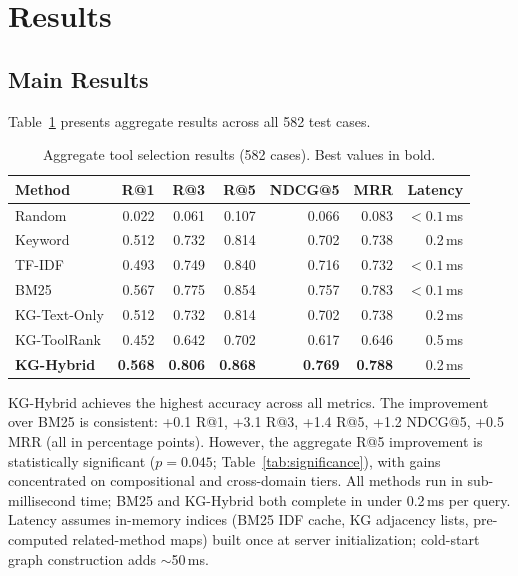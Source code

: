 \documentclass[11pt,a4paper]{article}
\begin{document}
\section{Results}
\label{sec:results}

\subsection{Main Results}

Table~\ref{tab:main-results} presents aggregate results across all 582 test cases.

\begin{table}[t]
\centering
\caption{Aggregate tool selection results (582 cases). Best values in bold.}
\label{tab:main-results}
\begin{tabular}{lrrrrrr}
\toprule
Method & R@1 & R@3 & R@5 & NDCG@5 & MRR & Latency \\
\midrule
Random & 0.022 & 0.061 & 0.107 & 0.066 & 0.083 & ${<}0.1$\,ms \\
Keyword & 0.512 & 0.732 & 0.814 & 0.702 & 0.738 & 0.2\,ms \\
TF-IDF & 0.493 & 0.749 & 0.840 & 0.716 & 0.732 & ${<}0.1$\,ms \\
BM25 & 0.567 & 0.775 & 0.854 & 0.757 & 0.783 & ${<}0.1$\,ms \\
KG-Text-Only & 0.512 & 0.732 & 0.814 & 0.702 & 0.738 & 0.2\,ms \\
KG-ToolRank & 0.452 & 0.642 & 0.702 & 0.617 & 0.646 & 0.5\,ms \\
\textbf{KG-Hybrid} & \textbf{0.568} & \textbf{0.806} & \textbf{0.868} & \textbf{0.769} & \textbf{0.788} & 0.2\,ms \\
\bottomrule
\end{tabular}
\end{table}

KG-Hybrid achieves the highest accuracy across all metrics. The improvement over BM25 is consistent: +0.1 R@1, +3.1 R@3, +1.4 R@5, +1.2 NDCG@5, +0.5 MRR (all in percentage points). However, the aggregate R@5 improvement is statistically significant ($p=0.045$; Table~\ref{tab:significance}), with gains concentrated on compositional and cross-domain tiers. All methods run in sub-millisecond time; BM25 and KG-Hybrid both complete in under 0.2\,ms per query. Latency assumes in-memory indices (BM25 IDF cache, KG adjacency lists, pre-computed related-method maps) built once at server initialization; cold-start graph construction adds $\sim$50\,ms.
\end{document}
